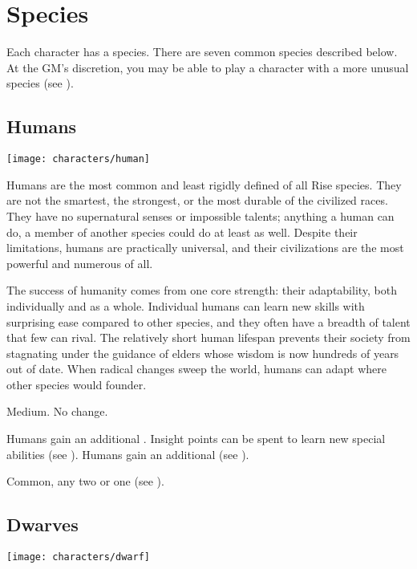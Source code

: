 \section{Species}\label{Species}
    Each character has a species.
    There are seven common species described below.
    At the GM's discretion, you may be able to play a character with a more unusual species (see ).

    \subsection{Humans}
        \texttt{[image: characters/human]}

        Humans are the most common and least rigidly defined of all Rise species.
        They are not the smartest, the strongest, or the most durable of the civilized races.
        They have no supernatural senses or impossible talents; anything a human can do, a member of another species could do at least as well.
        Despite their limitations, humans are practically universal, and their civilizations are the most powerful and numerous of all.

        The success of humanity comes from one core strength: their adaptability, both individually and as a whole.
        Individual humans can learn new skills with surprising ease compared to other species, and they often have a breadth of talent that few can rival.
        The relatively short human lifespan prevents their society from stagnating under the guidance of elders whose wisdom is now hundreds of years out of date.
        When radical changes sweep the world, humans can adapt where other species would founder.

         Medium.
         No change.
        \begin{raggeditemize}
             Humans gain an additional .
                Insight points can be spent to learn new special abilities (see ).
             Humans gain an additional  (see ).
        \end{raggeditemize}
         Common, any two  or one  (see ).

    \subsection{Dwarves}
        \texttt{[image: characters/dwarf]}

